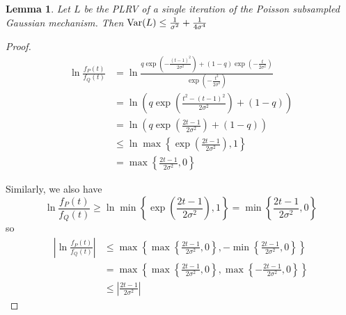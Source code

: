 \documentclass{article}
\theoremstyle{plain}
\newtheorem{lemma}[theorem]{Lemma}
\theoremstyle{definition}
\theoremstyle{remark}
\begin{document}
\begin{lemma}\label{lemma:subsampled-gaussian-mech-plrv-variance-bound}
    Let $L$ be the PLRV of a single iteration of the Poisson subsampled Gaussian mechanism. 
    Then $\operatorname{Var}(L) \leq \frac{1}{\sigma^2} + \frac{1}{4\sigma^4}$
\end{lemma}
\begin{proof}
    \begin{equation}
        \begin{split}
            \ln \frac{f_P(t)}{f_Q(t)} 
            &= \ln \frac{q \exp(-\frac{(t - 1)^2}{2\sigma^2}) + (1 - q)\exp(-\frac{t}{2\sigma^2})} {\exp(-\frac{t^2}{2\sigma^2})}
            \\&= \ln \left(q \exp(\frac{t^2 - (t - 1)^2}{2\sigma^2}) + (1 - q)\right)
            \\&= \ln \left(q \exp(\frac{2t - 1}{2\sigma^2}) + (1 - q)\right)
            \\&\leq \ln \max\left\{\exp(\frac{2t - 1}{2\sigma^2}), 1\right\}
            \\&= \max\left\{\frac{2t - 1}{2\sigma^2}, 0\right\}
        \end{split}
    \end{equation}

    Similarly, we also have
    \begin{equation}
        \ln \frac{f_P(t)}{f_Q(t)}
        \geq \ln \min\left\{\exp(\frac{2t - 1}{2\sigma^2}), 1\right\}
        = \min\left\{\frac{2t - 1}{2\sigma^2}, 0\right\}
    \end{equation}
    so 
    \begin{equation}
        \begin{split}
            \left|\ln \frac{f_P(t)}{f_Q(t)}\right|
            &\leq \max\left\{\max\left\{\frac{2t - 1}{2\sigma^2}, 0\right\},
            -\min\left\{\frac{2t - 1}{2\sigma^2}, 0\right\}\right\}
            \\&= \max\left\{\max\left\{\frac{2t - 1}{2\sigma^2}, 0\right\},
            \max\left\{-\frac{2t - 1}{2\sigma^2}, 0\right\}\right\}
            \\&\leq \left|\frac{2t - 1}{2\sigma^2}\right| 
        \end{split}
    \end{equation}


\end{proof}
\end{document}
